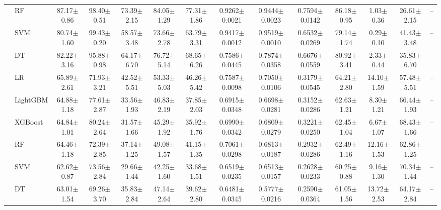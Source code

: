\begin{tabular}{@{}llcccccccccccc@{}}
 & RF & 87.17{\tiny$\pm$0.86} & 98.40{\tiny$\pm$0.51} & 73.39{\tiny$\pm$2.15} & 84.05{\tiny$\pm$1.29} & 77.31{\tiny$\pm$1.86} & 0.9262{\tiny$\pm$0.0021} & 0.9444{\tiny$\pm$0.0023} & 0.7594{\tiny$\pm$0.0142} & 86.18{\tiny$\pm$0.95} & 1.03{\tiny$\pm$0.36} & 26.61{\tiny$\pm$2.15} & --\\
 & SVM & 80.74{\tiny$\pm$1.60} & 99.43{\tiny$\pm$0.20} & 58.57{\tiny$\pm$3.48} & 73.66{\tiny$\pm$2.78} & 63.79{\tiny$\pm$3.31} & 0.9417{\tiny$\pm$0.0012} & 0.9519{\tiny$\pm$0.0010} & 0.6532{\tiny$\pm$0.0269} & 79.14{\tiny$\pm$1.74} & 0.29{\tiny$\pm$0.10} & 41.43{\tiny$\pm$3.48} & --\\
 & DT & 82.22{\tiny$\pm$3.16} & 95.88{\tiny$\pm$0.98} & 64.17{\tiny$\pm$6.70} & 76.72{\tiny$\pm$5.14} & 68.65{\tiny$\pm$6.26} & 0.7586{\tiny$\pm$0.0445} & 0.7874{\tiny$\pm$0.0358} & 0.6676{\tiny$\pm$0.0559} & 80.92{\tiny$\pm$3.41} & 2.33{\tiny$\pm$0.44} & 35.83{\tiny$\pm$6.70} & --\\
\midrule
{} & LR & 65.89{\tiny$\pm$2.61} & 71.93{\tiny$\pm$3.21} & 42.52{\tiny$\pm$5.51} & 53.33{\tiny$\pm$5.03} & 46.26{\tiny$\pm$5.42} & 0.7587{\tiny$\pm$0.0098} & 0.7050{\tiny$\pm$0.0106} & 0.3179{\tiny$\pm$0.0545} & 64.21{\tiny$\pm$2.80} & 14.10{\tiny$\pm$1.59} & 57.48{\tiny$\pm$5.51} & --\\
 & LightGBM & 64.88{\tiny$\pm$1.18} & 77.61{\tiny$\pm$2.87} & 33.56{\tiny$\pm$1.93} & 46.83{\tiny$\pm$2.19} & 37.85{\tiny$\pm$2.03} & 0.6915{\tiny$\pm$0.0348} & 0.6698{\tiny$\pm$0.0281} & 0.3152{\tiny$\pm$0.0286} & 62.63{\tiny$\pm$1.21} & 8.30{\tiny$\pm$1.21} & 66.44{\tiny$\pm$1.93} & --\\
 & XGBoost & 64.84{\tiny$\pm$1.01} & 80.24{\tiny$\pm$2.64} & 31.57{\tiny$\pm$1.66} & 45.29{\tiny$\pm$1.92} & 35.92{\tiny$\pm$1.76} & 0.6990{\tiny$\pm$0.0342} & 0.6809{\tiny$\pm$0.0279} & 0.3221{\tiny$\pm$0.0250} & 62.45{\tiny$\pm$1.04} & 6.67{\tiny$\pm$1.07} & 68.43{\tiny$\pm$1.66} & --\\
 & RF & 64.46{\tiny$\pm$1.18} & 72.39{\tiny$\pm$2.85} & 37.14{\tiny$\pm$1.25} & 49.08{\tiny$\pm$1.57} & 41.15{\tiny$\pm$1.35} & 0.7061{\tiny$\pm$0.0298} & 0.6813{\tiny$\pm$0.0187} & 0.2932{\tiny$\pm$0.0286} & 62.49{\tiny$\pm$1.16} & 12.16{\tiny$\pm$1.53} & 62.86{\tiny$\pm$1.25} & --\\
 & SVM & 62.62{\tiny$\pm$0.87} & 73.56{\tiny$\pm$2.84} & 29.66{\tiny$\pm$1.44} & 42.25{\tiny$\pm$1.60} & 33.68{\tiny$\pm$1.51} & 0.6519{\tiny$\pm$0.0235} & 0.6513{\tiny$\pm$0.0157} & 0.2628{\tiny$\pm$0.0233} & 60.25{\tiny$\pm$0.88} & 9.16{\tiny$\pm$1.30} & 70.34{\tiny$\pm$1.44} & --\\
 & DT & 63.01{\tiny$\pm$1.54} & 69.26{\tiny$\pm$3.70} & 35.83{\tiny$\pm$2.84} & 47.14{\tiny$\pm$2.64} & 39.62{\tiny$\pm$2.80} & 0.6481{\tiny$\pm$0.0345} & 0.5777{\tiny$\pm$0.0216} & 0.2590{\tiny$\pm$0.0364} & 61.05{\tiny$\pm$1.56} & 13.72{\tiny$\pm$2.53} & 64.17{\tiny$\pm$2.84} & --\\
\bottomrule
\end{tabular}